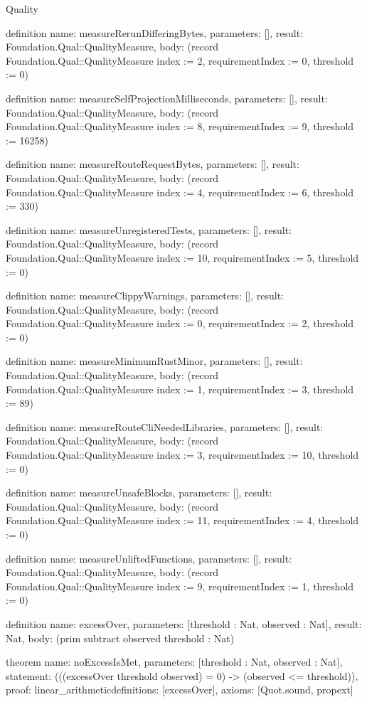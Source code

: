 \begin{lexlean}{Quality}
\begin{semanticmodule}
definition{
  name: measureRerunDifferingBytes,
  parameters: [],
  result: Foundation.Qual::QualityMeasure,
  body: (record Foundation.Qual::QualityMeasure {index := 2, requirementIndex := 0, threshold := 0})
}

definition{
  name: measureSelfProjectionMilliseconds,
  parameters: [],
  result: Foundation.Qual::QualityMeasure,
  body: (record Foundation.Qual::QualityMeasure {index := 8, requirementIndex := 9, threshold := 16258})
}

definition{
  name: measureRouteRequestBytes,
  parameters: [],
  result: Foundation.Qual::QualityMeasure,
  body: (record Foundation.Qual::QualityMeasure {index := 4, requirementIndex := 6, threshold := 330})
}

definition{
  name: measureUnregisteredTests,
  parameters: [],
  result: Foundation.Qual::QualityMeasure,
  body: (record Foundation.Qual::QualityMeasure {index := 10, requirementIndex := 5, threshold := 0})
}

definition{
  name: measureClippyWarnings,
  parameters: [],
  result: Foundation.Qual::QualityMeasure,
  body: (record Foundation.Qual::QualityMeasure {index := 0, requirementIndex := 2, threshold := 0})
}

definition{
  name: measureMinimumRustMinor,
  parameters: [],
  result: Foundation.Qual::QualityMeasure,
  body: (record Foundation.Qual::QualityMeasure {index := 1, requirementIndex := 3, threshold := 89})
}

definition{
  name: measureRouteCliNeededLibraries,
  parameters: [],
  result: Foundation.Qual::QualityMeasure,
  body: (record Foundation.Qual::QualityMeasure {index := 3, requirementIndex := 10, threshold := 0})
}

definition{
  name: measureUnsafeBlocks,
  parameters: [],
  result: Foundation.Qual::QualityMeasure,
  body: (record Foundation.Qual::QualityMeasure {index := 11, requirementIndex := 4, threshold := 0})
}

definition{
  name: measureUnliftedFunctions,
  parameters: [],
  result: Foundation.Qual::QualityMeasure,
  body: (record Foundation.Qual::QualityMeasure {index := 9, requirementIndex := 1, threshold := 0})
}

definition{
  name: excessOver,
  parameters: [threshold : Nat, observed : Nat],
  result: Nat,
  body: (prim subtract observed threshold : Nat)
}

theorem{
  name: noExcessIsMet,
  parameters: [threshold : Nat, observed : Nat],
  statement: (((excessOver threshold observed) = 0) -> (observed <= threshold)),
  proof: linear_arithmetic{definitions: [excessOver]},
  axioms: [Quot.sound, propext]
}


\end{semanticmodule}
\end{lexlean}
